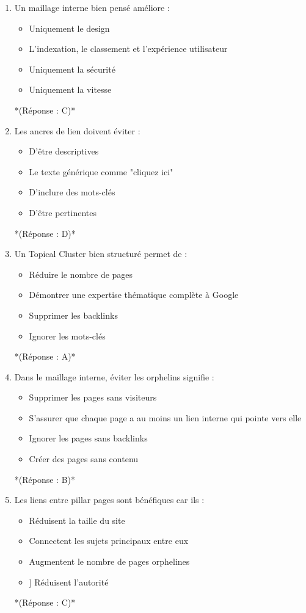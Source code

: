 \documentclass[12pt,a4paper,twoside]{report}
\begin{document}
\begin{enumerate}
\item Un maillage interne bien pensé améliore :
\begin{itemize}
\item[A)] Uniquement le design
\item[B)] L'indexation, le classement et l'expérience utilisateur
\item[C)] Uniquement la sécurité
\item[D)] Uniquement la vitesse
\end{itemize}
*(Réponse : C)*

\item Les ancres de lien doivent éviter :
\begin{itemize}
\item[A)] D'être descriptives
\item[B)] Le texte générique comme "cliquez ici"
\item[C)] D'inclure des mots-clés
\item[D)] D'être pertinentes
\end{itemize}
*(Réponse : D)*

\item Un Topical Cluster bien structuré permet de :
\begin{itemize}
\item[A)] Réduire le nombre de pages
\item[B)] Démontrer une expertise thématique complète à Google
\item[C)] Supprimer les backlinks
\item[D)] Ignorer les mots-clés
\end{itemize}
*(Réponse : A)*

\item Dans le maillage interne, éviter les orphelins signifie :
\begin{itemize}
\item[A)] Supprimer les pages sans visiteurs
\item[B)] S'assurer que chaque page a au moins un lien interne qui pointe vers elle
\item[C)] Ignorer les pages sans backlinks
\item[D)] Créer des pages sans contenu
\end{itemize}
*(Réponse : B)*

\item Les liens entre pillar pages sont bénéfiques car ils :
\begin{itemize}
\item[A)] Réduisent la taille du site
\item[B)] Connectent les sujets principaux entre eux
\item[C)] Augmentent le nombre de pages orphelines
\item[D]] Réduisent l'autorité
\end{itemize}
*(Réponse : C)*


\end{enumerate}
\end{document}
